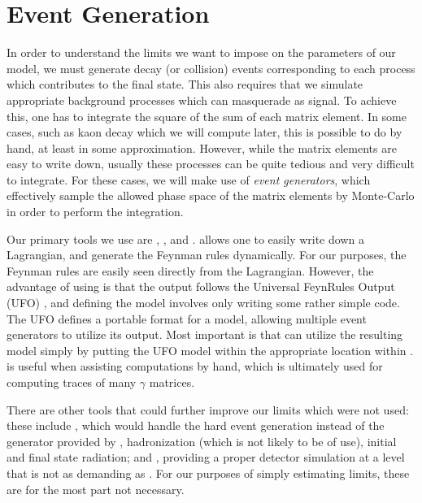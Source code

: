 \section{Event Generation}

In order to understand the limits we want to impose on the parameters of our model, we must generate decay (or collision) events corresponding to each process which contributes to the final state.
This also requires that we simulate appropriate background processes which can masquerade as signal.
To achieve this, one has to integrate the square of the sum of each matrix element.
In some cases, such as kaon decay which we will compute later, this is possible to do by hand, at least in some approximation.
However, while the matrix elements are easy to write down, usually these processes can be quite tedious and very difficult to integrate.
For these cases, we will make use of \emph{event generators}, which effectively sample the allowed phase space of the matrix elements by Monte-Carlo in order to perform the integration.

Our primary tools we use are \feynrules \cite{Alloul:2013bka}, \feyncalc \cite{Mertig:1990an}, and \mgamcnlo \cite{Alwall:2011uj,Alwall:2014hca}.
\feynrules allows one to easily write down a Lagrangian, and generate the Feynman rules dynamically.
For our purposes, the Feynman rules are easily seen directly from the Lagrangian.
However, the advantage of using \feynrules is that the output follows the Universal FeynRules Output (UFO) \cite{Degrande:2011ua}, and defining the model involves only writing some rather simple \mathematica code.
The UFO defines a portable format for a model, allowing multiple event generators to utilize its output.
Most important is that \madgraph can utilize the resulting model simply by putting the UFO model within the appropriate location within \madgraph.
\feyncalc is useful when assisting computations by hand, which is ultimately used for computing traces of many $\gamma$ matrices.

There are other tools that could further improve our limits which were not used: these include \pythia \cite{Sjostrand:2007gs}, which would handle the hard event generation instead of the generator provided by \madgraph, hadronization (which is not likely to be of use), initial and final state radiation; and \delphes \cite{Selvaggi:2014mya}, providing a proper detector simulation at a level that is not as demanding as \geant \cite{Agostinelli:2002hh}. For our purposes of simply estimating limits, these are for the most part not necessary.

